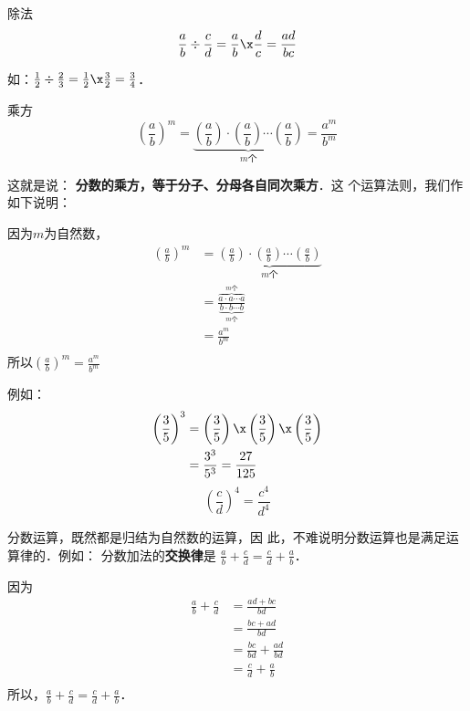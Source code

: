 \begin{blk}{除法}
	\[\frac{a}{b}\div \frac{c}{d}=\frac{a}{b}\x\frac{d}{c}=\frac{ad}{bc}\]
\end{blk}

如：$\frac{1}{2}\div\frac{2}{3}=\frac{1}{2}\x \frac{3}{2}=\frac{3}{4}$．

\begin{blk}{乘方}
	\[\left(\frac{a}{b}\right)^m=\underbrace{\left(\frac{a}{b}\right)\cdot \left(\frac{a}{b}\right)\cdots \left(\frac{a}{b}\right)}_{\text{$m$个}}=\frac{a^m}{b^m}\]
\end{blk}

这就是说：
\textbf{分数的乘方，等于分子、分母各自同次乘方}．这
个运算法则，我们作如下说明：

\begin{note}
	因为$m$为自然数，
	\begin{align*}
	\left(\frac{a}{b}\right)^m&=\underbrace{\left(\frac{a}{b}\right)\cdot \left(\frac{a}{b}\right)\cdots \left(\frac{a}{b}\right)}_{\text{$m$个}}
	\tag{乘方的意义}\\
	&=\frac{\overbrace{a\cdot a\cdots a}^{\text{$m$个}}}{\underbrace{b\cdot b\cdots b}_{\text{$m$个}}} \tag{分数乘法法则}\\
	&= \frac{a^m}{b^m}\tag{乘方的意义}\\
	\end{align*}
	所以$\left(\frac{a}{b}\right)^m=\frac{a^m}{b^m}$
\end{note}

例如：
\[ \begin{split}
\left(\frac{3}{5}\right)^3&=\left(\frac{3}{5}\right)\x \left(\frac{3}{5}\right)\x \left(\frac{3}{5}\right)\\
&=\frac{3^3}{5^3}=\frac{27}{125}
\end{split} \]
\[ \left(\frac{c}{d}\right)^4=\frac{c^4}{d^4} \]

分数运算，既然都是归结为自然数的运算，因
此，不难说明分数运算也是满足运算律的．例如：
分数加法的\textbf{交换律}是
$\frac{a}{b}+\frac{c}{d}=\frac{c}{d}+\frac{a}{b}$．

\begin{note}
	因为
	\begin{align*}
	\frac{a}{b}+\frac{c}{d}&=\frac{ad+bc}{bd} \tag{分数加法法则}\\
	&=\frac{bc+ad}{bd}\tag{自然数加法交换律}\\
	&=\frac{bc}{bd}+\frac{ad}{bd}\\
	&=\frac{c}{d}+\frac{a}{b}\tag{分数的基本性质}\\
	\end{align*}
	所以，$\frac{a}{b}+\frac{c}{d}=\frac{c}{d}+\frac{a}{b}$．
\end{note}


